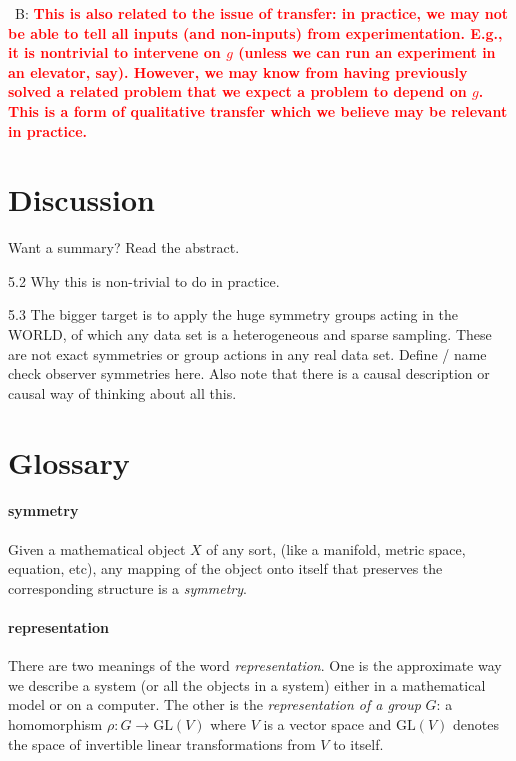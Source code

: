 \documentclass{article}
\theoremstyle{plain}
\theoremstyle{definition}
\theoremstyle{remark}
\newcommand{\bernhard}[1]{~B: \textcolor{red}{\textbf{#1}}}
\begin{document}
\bernhard{This is also related to the issue of transfer: in practice, we may not be able to tell all inputs (and non-inputs) from experimentation. E.g., it is nontrivial to intervene on $g$ (unless we can run an experiment in an elevator, say). However, we may know from having previously solved a related problem that we expect a problem to depend on $g$. This is a form of qualitative transfer which we believe may be relevant in practice.}

\section{Discussion}\label{sec:summary}

Want a summary? Read the abstract.

   5.2 Why this is non-trivial to do in practice.
   
   5.3 The bigger target is to apply the huge symmetry groups acting in the WORLD, of which any data set is a heterogeneous and sparse sampling. These are not exact symmetries or group actions in any real data set. Define / name check observer symmetries here. Also note that there is a causal description or causal way of thinking about all this.

{\raggedright


}

\newpage\appendix\onecolumn
\section{Glossary}
\paragraph{symmetry}
Given a mathematical object $X$ of any sort, (like a manifold, metric space, equation, etc), any mapping of the object onto itself that preserves the corresponding structure is a \emph{symmetry}.

\paragraph{representation}
There are two meanings of the word \emph{representation}. One is the approximate way we describe a system (or all the objects in a system) either in a mathematical model or on a computer.
The other is the \emph{representation of a group} $G$: a homomorphism $\rho: G\to \text{GL}(V)$ where $V$ is a vector space and $\text{GL}(V)$ denotes the space of invertible linear transformations from $V$ to itself.
\end{document}
